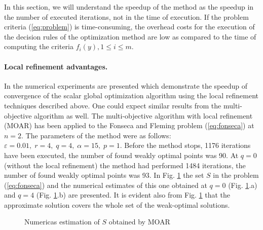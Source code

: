 \documentclass{llncs}
\begin{document}
In this section, we will understand the speedup of the method as the speedup in the
number of executed iterations, not in the time of execution. If the problem
criteria (\ref{eq:problem}) is time-consuming, the overhead costs for the execution of the
decision rules of the optimization method are low as compared to the time of computing the
criteria \(f_i(y), 1\leqslant i\leqslant m\).

\paragraph{Local refinement advantages.} In \cite{barkalovLebedev2016} the numerical experiments
are presented which demonstrate the speedup of convergence of the scalar global optimization algorithm using the local refinement techniques described above.
One could expect similar results from the multi-objective algorithm as well. The multi-objective
algorithm with local refinement (MOAR) has been applied to the  Fonseca and Fleming
problem (\ref{eq:fonseca}) at \(n=2\). The parameters of the method were as follows:
\(\varepsilon=0.01,\;r=4,\;q=4,\;\alpha=15,\;p=1\). Before the method stops, 1176 iterations
have been executed, the number of found weakly optimal points was 90. At \(q=0\) (without the
local refinement) the method had performed 1484 iterations, the number of found weakly
optimal points was 93. In Fig. \ref{fig:fonseca_slater} the set \(S\) in the problem
(\ref{eq:fonseca}) and the numerical estimates of this one obtained at \(q=0\) (Fig.
\ref{fig:fonseca_slater}.a) and \(q=4\) (Fig. \ref{fig:fonseca_slater}.b) are presented. It is
evident also from Fig. \ref{fig:fonseca_slater} that the approximate solution covers the whole
set of the weak-optimal solutions.

\begin{figure}[ht]
    \centering
    \caption{Numericas estimation of \(S\) obtained by MOAR}
    \label{fig:fonseca_slater}
\end{figure}
\end{document}
